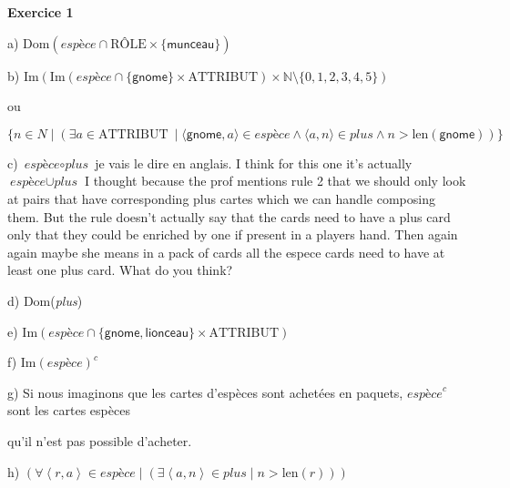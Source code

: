 \documentclass{article}
\newcommand{\role}{\mbox{RÔLE}}
\newcommand{\attribut}{\mbox{ATTRIBUT}}
\newcommand{\compose}{\circ}
\newcommand{\tuple}[1]{\ensuremath{\left\langle #1 \right\rangle}}
\begin{document}
\textbf{Exercice 1}

a) $\text{Dom}(\textit{espèce} \cap \role \times \{ \textsf{munceau} \} )$

\vspace{0.5cm}

b) $ \text{Im}( \text{Im}( \textit{espèce} \cap \{ \textsf{gnome} \} \times \attribut ) \times \mathbb{N} \setminus \{ 0,1,2,3,4,5 \} ) $ 

ou

$\{ n \in N \mid (\exists a \in \attribut\ \mid \langle \textsf{gnome},a  \rangle \in \textit{espèce} \land \langle a,n \rangle \in \textit{plus} \land n > \text{len}(\textsf{gnome}) )\}$

\vspace{0.5cm}

c) $\textit{espèce} \compose \textit{plus}$ je vais le dire en anglais. I think for this one it's actually $\textit{espèce} \cup \textit{plus}$ I thought 
because the prof mentions rule 2 that we should only look at pairs that have corresponding plus cartes which we can handle composing them. 
But the rule doesn't actually say that the cards need to have a plus card only that they could be enriched by one if present in a players hand. 
Then again again maybe she means in a pack of cards all the espece cards need to have at least one plus card. What do you think?

\vspace{0.5cm}

d) Dom(\textit{plus})

\vspace{0.5cm}

e) $ \text{Im}(\textit{espèce} \cap \{ \textsf{gnome}, \textsf{lionceau} \} \times \attribut)$

\vspace{0.5cm}

f) $ \text{Im}(\textit{espèce})^{c} $

\vspace{0.5cm}

g) Si nous imaginons que les cartes d'espèces sont achetées en paquets, $\textit{espèce}^{c}$ sont les cartes espèces 

qu'il n'est pas possible d'acheter.

\vspace{0.5cm}

h) $( \forall \tuple{r,a} \in \textit{espèce} \mid ( \exists \tuple{a,n} \in \textit{plus} \mid n > \text{len}(r) ))$

\vspace{0.5cm}
\end{document}
